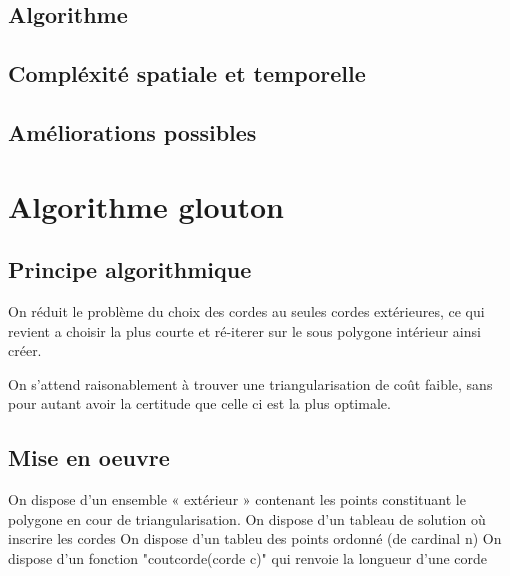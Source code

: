 \documentclass[a4paper,10pt]{article}
\begin{document}
 

\subsection{Algorithme}

\subsection{Compléxité spatiale et temporelle}

\subsection{Améliorations possibles}

\section{Algorithme glouton}


\subsection{Principe algorithmique}

On réduit le problème du choix des cordes au seules cordes extérieures, ce qui revient a choisir la plus courte et ré-iterer sur le sous polygone intérieur ainsi créer.

On s'attend raisonablement à trouver une triangularisation de coût faible, sans pour autant avoir la certitude que celle ci est la plus optimale.

\subsection{Mise en oeuvre}
 

On dispose d'un ensemble « extérieur » contenant les points constituant le polygone en cour de triangularisation.
On dispose d'un tableau de solution où inscrire les cordes
On dispose d'un tableu des points ordonné (de cardinal n)
On dispose d'un fonction "coutcorde(corde c)" qui renvoie la longueur d'une corde
 
 
 
\end{document}
